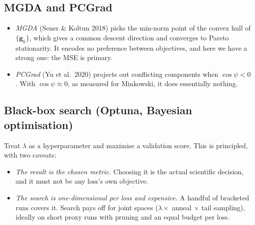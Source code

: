 \documentclass[11pt,a4paper]{article}
\theoremstyle{definition}
\theoremstyle{remark}
\newcommand{\g}{\bm{g}}
\begin{document}
\subsection{MGDA and PCGrad}
\begin{itemize}[nosep]
\item \emph{MGDA} (Sener \& Koltun 2018) picks the min-norm point of the convex hull of
  $\{\g_k\}$, which gives a common descent direction and converges to Pareto stationarity.
  It encodes no preference between objectives, and here we have a strong one: the MSE is
  primary.
\item \emph{PCGrad} (Yu et al.\ 2020) projects out conflicting components when
  $\cos\psi<0$. With $\cos\psi\approx0$, as measured for Minkowski, it does essentially
  nothing.
\end{itemize}

\subsection{Black-box search (Optuna, Bayesian optimisation)}
Treat $\lambda$ as a hyperparameter and maximise a validation score. This is principled,
with two caveats:
\begin{itemize}[nosep]
\item \emph{The result is the chosen metric.} Choosing it is the actual scientific decision,
  and it must not be any loss's own objective.
\item \emph{The search is one-dimensional per loss and expensive.} A handful of bracketed
  runs covers it. Search pays off for joint spaces ($\lambda\times$ anneal $\times$ tail
  sampling), ideally on short proxy runs with pruning and an equal budget per loss.
\end{itemize}
\end{document}
